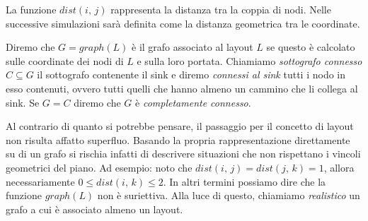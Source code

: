 \documentclass[a4paper,12pt]{article}
\theoremstyle{definition}
\begin{document}

La funzione $dist(i,\,j)$ rappresenta la distanza tra la coppia di nodi. Nelle successive simulazioni sarà definita come la distanza geometrica tra le coordinate.


Diremo che $G = graph(L)$ è il grafo associato al layout $L$ se questo è calcolato sulle coordinate dei nodi di $L$ e sulla loro portata. Chiamiamo \emph{sottografo connesso} $C \subseteq G$ il sottografo contenente il sink e diremo \emph{connessi al sink} tutti i nodo in esso contenuti, ovvero tutti quelli che hanno almeno un cammino che li collega al sink. Se $G = C$ diremo che $G$ è \emph{completamente connesso}.

Al contrario di quanto si potrebbe pensare, il passaggio per il concetto di layout non risulta affatto superfluo. Basando la propria rappresentazione direttamente su di un grafo si rischia infatti di descrivere situazioni che non rispettano i vincoli geometrici del piano. Ad esempio: noto che $dist(i,\,j) = dist(j,\,k) = 1$, allora necessariamente $0 \leq dist(i,\,k) \leq 2$. In altri termini possiamo dire che la funzione $graph(L)$ non è suriettiva. Alla luce di questo, chiamiamo \emph{realistico} un grafo a cui è associato almeno un layout.
\end{document}

